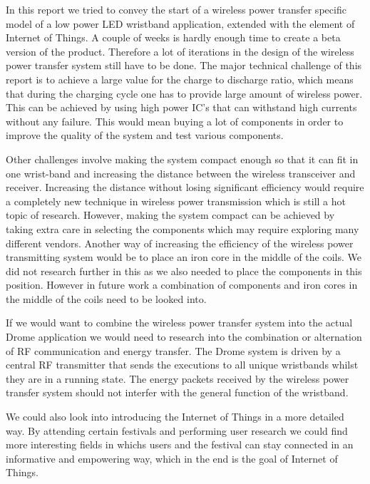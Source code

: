 %
In this report we tried to convey the start of a wireless power transfer specific model of a low power LED wristband application, extended with the element of Internet of Things. A couple of weeks is hardly enough time to create a beta version of the product. Therefore a lot of iterations in the design of the wireless power transfer system still have to be done. The major technical challenge of this report is to achieve a large value for the charge to discharge ratio, which means that during the charging cycle one has to provide large amount of wireless power. This can be achieved by using high power IC's that can withstand high currents without any failure. This would mean buying a lot of components in order to improve the quality of the system and test various components. 

Other challenges involve making the system compact enough so that it can fit in one wrist-band and increasing the distance between the wireless transceiver and receiver. Increasing the distance without losing significant efficiency would require a completely new technique in wireless power transmission which is still a hot topic of research. However, making the system compact can be achieved by taking extra care in selecting the components which may require exploring many different vendors. Another way of increasing the efficiency of the wireless power transmitting system would be to place an iron core in the middle of the coils. We did not research further in this as we also needed to place the components in this position. However in future work a combination of components and iron cores in the middle of the coils need to be looked into. 

If we would want to combine the wireless power transfer system into the actual Drome application we would need to research into the combination or alternation of RF communication and energy transfer. The Drome system is driven by a central RF transmitter that sends the executions to all unique wristbands whilst they are in a running state. The energy packets received by the wireless power transfer system should not interfer with the general function of the wristband. 

We could also look into introducing the Internet of Things in a more detailed way. By attending certain festivals and performing user research we could find more interesting fields in whichs users and the festival can stay connected in an informative and empowering way, which in the end is the goal of Internet of Things. 




